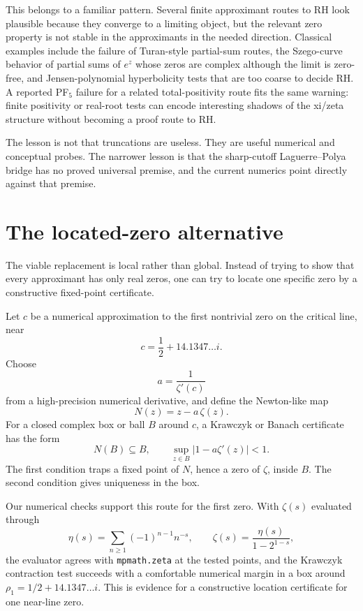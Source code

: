 \documentclass[11pt]{article}
\newcommand{\zetaR}{\zeta}
\begin{document}
This belongs to a familiar pattern.  Several finite approximant routes to RH
look plausible because they converge to a limiting object, but the relevant
zero property is not stable in the approximants in the needed direction.
Classical examples include the failure of Turan-style partial-sum routes, the
Szego-curve behavior of partial sums of $e^z$ whose zeros are complex although
the limit is zero-free, and Jensen-polynomial hyperbolicity tests that are too
coarse to decide RH.  A reported PF$_5$ failure for a related total-positivity
route fits the same warning: finite positivity or real-root tests can encode
interesting shadows of the xi/zeta structure without becoming a proof route
to RH.

The lesson is not that truncations are useless.  They are useful numerical and
conceptual probes.  The narrower lesson is that the sharp-cutoff
Laguerre--Polya bridge has no proved universal premise, and the current
numerics point directly against that premise.

\section{The located-zero alternative}

The viable replacement is local rather than global.  Instead of trying to
show that every approximant has only real zeros, one can try to locate one
specific zero by a constructive fixed-point certificate.

Let $c$ be a numerical approximation to the first nontrivial zero on the
critical line, near
$$
  c=\frac12+14.1347\ldots i .
$$
Choose
$$
  a=\frac{1}{\zetaR'(c)}
$$
from a high-precision numerical derivative, and define the Newton-like map
$$
  N(z)=z-a\,\zetaR(z).
$$
For a closed complex box or ball $B$ around $c$, a Krawczyk or Banach
certificate has the form
$$
  N(B)\subseteq B,
  \qquad
  \sup_{z\in B}|1-a\zetaR'(z)|<1 .
$$
The first condition traps a fixed point of $N$, hence a zero of $\zetaR$,
inside $B$.  The second condition gives uniqueness in the box.

Our numerical checks support this route for the first zero.  With
$\zetaR(s)$ evaluated through
$$
  \eta(s)=\sum_{n\geq1}(-1)^{n-1}n^{-s},
  \qquad
  \zetaR(s)=\frac{\eta(s)}{1-2^{1-s}},
$$
the evaluator agrees with \texttt{mpmath.zeta} at the tested points, and the
Krawczyk contraction test succeeds with a comfortable numerical margin in a
box around $\rho_1=1/2+14.1347\ldots i$.  This is evidence for a
constructive location certificate for one near-line zero.
\end{document}
